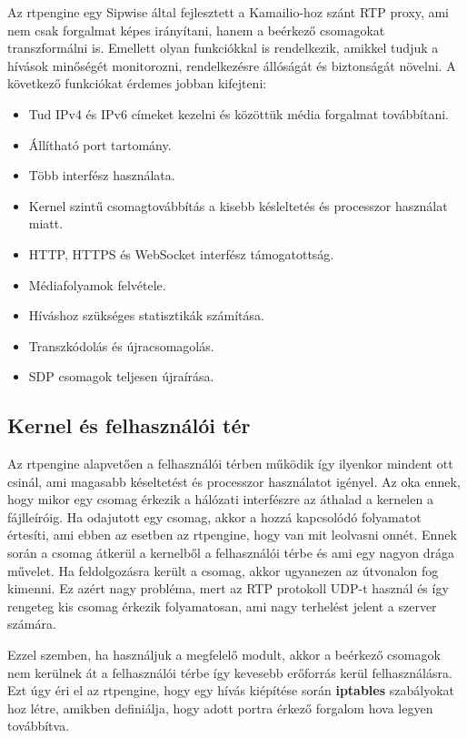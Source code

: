 Az rtpengine egy Sipwise  által fejlesztett a Kamailio-hoz szánt RTP 
proxy, ami nem csak forgalmat képes irányítani, hanem a beérkező csomagokat transzformálni is.
Emellett olyan funkciókkal is rendelkezik, amikkel tudjuk a hívások minőségét monitorozni, 
rendelkezésre állóságát és biztonságát növelni. A következő funkciókat érdemes 
jobban kifejteni: 

\begin{itemize}
	\item Tud IPv4 és IPv6 címeket kezelni és közöttük média forgalmat továbbítani. 
	\item Állítható port tartomány. 
	\item Több interfész használata. 
	\item Kernel szintű csomagtovábbítás a kisebb késleltetés és processzor használat miatt.
	\item HTTP, HTTPS és WebSocket interfész támogatottság.
	\item Médiafolyamok felvétele. 
	\item Híváshoz szükséges statisztikák számítása.
	\item Transzkódolás és újracsomagolás.
	\item SDP csomagok teljesen újraírása. 
\end{itemize}

\subsection{Kernel és felhasználói tér}

Az rtpengine alapvetően a felhasználói térben működik így ilyenkor mindent ott csinál, ami
magasabb késeltetést és processzor használatot igényel. Az oka ennek, hogy mikor egy csomag
érkezik a hálózati interfészre az áthalad a kernelen a fájlleíróig. Ha odajutott egy 
csomag, akkor a hozzá kapcsolódó folyamatot értesíti, ami ebben az esetben az rtpengine, hogy
van mit leolvasni onnét. Ennek során a csomag átkerül a kernelből a felhasználói térbe és 
ami egy nagyon drága művelet. Ha feldolgozásra került a csomag, akkor ugyanezen az útvonalon
fog kimenni. Ez azért nagy probléma, mert az RTP protokoll UDP-t használ és így rengeteg 
kis csomag érkezik folyamatosan, ami nagy terhelést jelent a szerver számára. 

Ezzel szemben, ha használjuk a megfelelő modult, akkor a beérkező csomagok nem kerülnek át a 
felhasználói térbe így kevesebb erőforrás kerül felhasználásra. Ezt úgy éri el az rtpengine,
hogy egy hívás kiépítése során \textbf{iptables} szabályokat hoz létre, amikben definiálja, hogy
adott portra érkező forgalom hova legyen továbbítva. 

